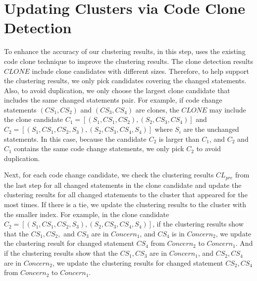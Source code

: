 \section{Updating Clusters via Code Clone Detection}

To enhance the accuracy of our clustering results, in this step, \tool uses the existing code clone technique \cite{svajlenko2017fast} to improve the clustering results. The clone detection results $CLONE$ include clone candidates with different sizes. Therefore, to help support the clustering results, we only pick candidates covering the changed statements. Also, to avoid duplication, we only choose the largest clone candidate that includes the same changed statements pair. For example, if code change statements $(CS_1, CS_2)$ and $(CS_3, CS_4)$ are clones, the $CLONE$ may include the clone candidate $C_1 = [(S_1, CS_1, CS_2), (S_2, CS_3, CS_4)]$ and $C_2= [(S_1, CS_1, CS_2, S_3), (S_2, CS_3, CS_4, S_4)]$ where $S_i$ are the unchanged statements. In this case, because the candidate $C_2$ is larger than $C_1$, and $C_2$ and $C_1$ contains the same code change statements, we only pick $C_2$ to avoid duplication. 

Next, for each code change candidate, we check the clustering results $CL_{pre}$ from the last step for all changed statements in the clone candidate and update the clustering results for all changed statements to the cluster that appeared for the most times. If there is a tie, we update the clustering results to the cluster with the smaller index. For example, in the clone candidate $C_2= [(S_1, CS_1, CS_2, S_3), (S_2, CS_3, CS_4, S_4)]$, if the clustering results show that the $CS_1, CS_2,$ and $CS_3$ are in $Concern_1$, and $CS_4$ is in $Concern_2$, we update the clustering result for changed statement $CS_4$ from $Concern_2$ to $Concern_1$. And if the clustering results show that the $CS_1, CS_3$ are in $Concern_1$, and $CS_2, CS_4$ are in $Concern_2$, we update the clustering results for changed statement $CS_2, CS_4$ from $Concern_2$ to $Concern_1$.
